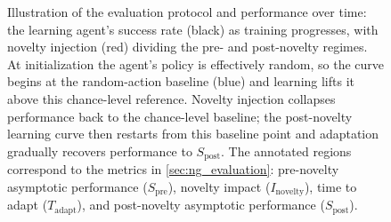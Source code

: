 \begin{figure}[t]
    \caption[\NovelGym{} evaluation protocol and metrics]{Illustration of the \NovelGym{} evaluation protocol and performance over time: the learning agent's success rate (black) as training progresses, with novelty injection (red) dividing the pre- and post-novelty regimes. At initialization the agent's policy is effectively random, so the curve begins at the random-action baseline (blue) and learning lifts it above this chance-level reference. Novelty injection collapses performance back to the chance-level baseline; the post-novelty learning curve then restarts from this baseline point and adaptation gradually recovers performance to $S_{\text{post}}$. The annotated regions correspond to the metrics in \cref{sec:ng_evaluation}: pre-novelty asymptotic performance ($S_{\text{pre}}$), novelty impact ($I_{\text{novelty}}$), time to adapt ($T_{\text{adapt}}$), and post-novelty asymptotic performance ($S_{\text{post}}$).}
    \label{fig:ng_metrics}
\end{figure}

